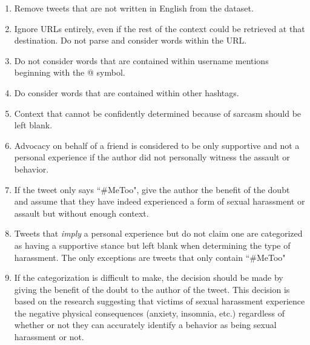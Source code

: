 \begin{enumerate}
  \item Remove tweets that are not written in English from the dataset.
  \item Ignore URLs entirely, even if the rest of the context could be retrieved at that destination. Do not parse and consider words within the URL.
  \item Do not consider words that are contained within username mentions beginning with the @ symbol.
  \item Do consider words that are contained within other hashtags.
  \item Context that cannot be confidently determined because of sarcasm should be left blank.
  \item Advocacy on behalf of a friend is considered to be only supportive and not a personal experience if the author did not personally witness the assault or behavior.
  \item If the tweet only says ``\#MeToo", give the author the benefit of the doubt and assume that they have indeed experienced a form of sexual harassment or assault but without enough context.
  \item Tweets that \textit{imply} a personal experience but do not claim one are categorized as having a supportive stance but left blank when determining the type of harassment. The only exceptions are tweets that only contain ``\#MeToo"
  \item If the categorization is difficult to make, the decision should be made by giving the benefit of the doubt to the author of the tweet. This decision is based on the research suggesting that victims of sexual harassment experience the negative physical consequences (anxiety, insomnia, etc.) regardless of whether or not they can accurately identify a behavior as being sexual harassment or not.
\end{enumerate}
